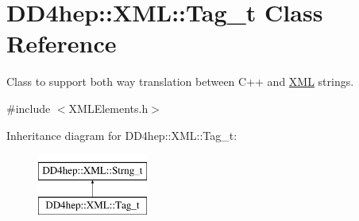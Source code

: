 \hypertarget{class_d_d4hep_1_1_x_m_l_1_1_tag__t}{}\section{D\+D4hep\+:\+:X\+ML\+:\+:Tag\+\_\+t Class Reference}
\label{class_d_d4hep_1_1_x_m_l_1_1_tag__t}


Class to support both way translation between C++ and \hyperlink{namespace_d_d4hep_1_1_x_m_l}{X\+ML} strings.  




{\ttfamily \#include $<$X\+M\+L\+Elements.\+h$>$}

Inheritance diagram for D\+D4hep\+:\+:X\+ML\+:\+:Tag\+\_\+t\+:\begin{figure}[H]
\begin{center}
\leavevmode
\includegraphics[height=2.000000cm]{class_d_d4hep_1_1_x_m_l_1_1_tag__t}
\end{center}
\end{figure}
